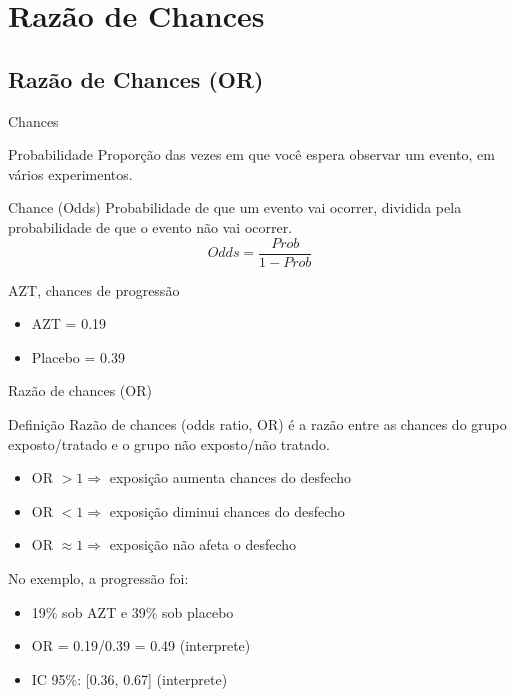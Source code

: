 \documentclass{beamer}
\begin{document}
\section{Razão de Chances}

\subsection{Razão de Chances (OR)}

\begin{frame}{Chances}
  \begin{block}{Probabilidade}
    Proporção das vezes em que você espera observar um evento, em vários experimentos.
  \end{block}
  \begin{block}{Chance (Odds)}
    Probabilidade de que um evento vai ocorrer, dividida pela probabilidade de que o evento não vai ocorrer.
    \begin{displaymath}
      Odds = \frac{Prob}{1- Prob}
    \end{displaymath}
  \end{block}
  \begin{exampleblock}{AZT, chances de progressão}
    \begin{itemize}
    \item AZT = 0.19
    \item Placebo = 0.39
    \end{itemize}
  \end{exampleblock}
\end{frame}

\begin{frame}{Razão de chances (OR)}
  \begin{block}{Definição}
    Razão de chances (odds ratio, OR) é a razão entre as chances do grupo exposto/tratado e o grupo não exposto/não tratado.
  \end{block}
  \begin{itemize}
  \item OR $> 1 \Rightarrow$ exposição aumenta chances do desfecho
  \item OR $< 1 \Rightarrow$ exposição diminui chances do desfecho
  \item OR $\approx 1 \Rightarrow$ exposição não afeta o desfecho
  \end{itemize}
  \begin{exampleblock}{No exemplo, a progressão foi:}
    \begin{itemize}
    \item 19\% sob AZT e 39\% sob placebo
    \item OR = 0.19/0.39 = 0.49 (interprete)
    \item<2-> IC 95\%: [0.36, 0.67] (interprete)
    \end{itemize}
  \end{exampleblock}
\end{frame}
\end{document}
